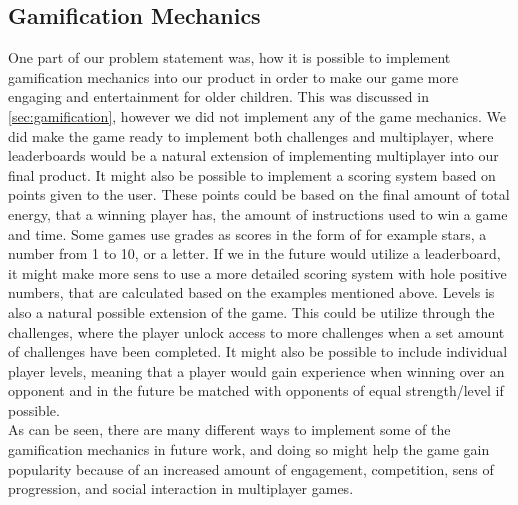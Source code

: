 \subsection{Gamification Mechanics}
One part of our problem statement was, how it is possible to implement gamification mechanics into our product in order to make our game more engaging and entertainment for older children. This was discussed in \autoref{sec:gamification}, however we did not implement any of the game mechanics. We did make the game ready to implement both challenges and multiplayer, where leaderboards would be a natural extension of implementing multiplayer into our final product. It might also be possible to implement a scoring system based on points given to the user. These points could be based on the final amount of total energy, that a winning player has, the amount of instructions used to win a game and time. Some games use grades as scores in the form of for example stars, a number from 1 to 10, or a letter. If we in the future would utilize a leaderboard, it might make more sens to use a more detailed scoring system with hole positive numbers, that are calculated based on the examples mentioned above. Levels is also a natural possible extension of the game. This could be utilize through the challenges, where the player unlock access to more challenges when a set amount of challenges have been completed. It might also be possible to include individual player levels, meaning that a player would gain experience when winning over an opponent and in the future be matched with opponents of equal strength/level if possible.\\

As can be seen, there are many different ways to implement some of the gamification mechanics in future work, and doing so might help the game gain popularity because of an increased amount of engagement, competition, sens of progression, and social interaction in multiplayer games.
